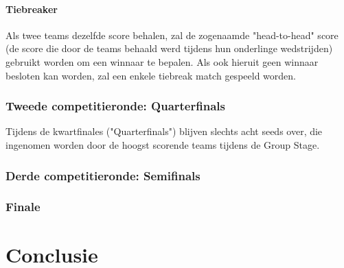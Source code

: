 \documentclass[12pt,a4paper]{article}
\begin{document}
				\paragraph{Tiebreaker}
				Als twee teams dezelfde score behalen, zal de zogenaamde "head-to-head" score (de score die door de teams behaald werd tijdens hun onderlinge wedstrijden) gebruikt worden om een winnaar te bepalen. Als ook hieruit geen winnaar besloten kan worden, zal een enkele tiebreak match gespeeld worden.
			\subsubsection{Tweede competitieronde: Quarterfinals}
				Tijdens de kwartfinales ("Quarterfinals") blijven slechts acht seeds over, die ingenomen worden door de hoogst scorende teams tijdens de Group Stage. 
			\subsubsection{Derde competitieronde: Semifinals}
			\subsubsection{Finale}
	\section{Conclusie}
\end{document}
